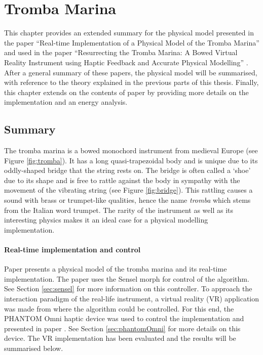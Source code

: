 \chapter{Tromba Marina}\label{ch:tromba}
This chapter provides an extended summary for the physical model presented in the paper ``Real-time Implementation of a Physical Model of the Tromba Marina'' \citeP[D] and used in the paper ``Resurrecting the Tromba Marina: A Bowed Virtual Reality Instrument using Haptic Feedback and Accurate Physical Modelling'' \citeP[E]. After a general summary of these papers, the physical model will be summarised, with reference to the theory explained in the previous parts of this thesis. Finally, this chapter extends on the contents of paper \citeP[D] by providing more details on the implementation and an energy analysis.

\section{Summary}
The tromba marina is a bowed monochord instrument from medieval Europe (see Figure \ref{fig:tromba}). It has a long quasi-trapezoidal body and is unique due to its oddly-shaped bridge that the string rests on. The bridge is often called a `shoe' due to its shape and is free to rattle against the body in sympathy with the movement of the vibrating string (see Figure \ref{fig:bridge}). This rattling causes a sound with brass or trumpet-like qualities, hence the name \textit{tromba} which stems from the Italian word trumpet. The rarity of the instrument as well as its interesting physics makes it an ideal case for a physical modelling implementation.

\subsubsection{Real-time implementation and control}
Paper \citeP[D] presents a physical model of the tromba marina and its real-time implementation. The paper uses the Sensel morph for control of the algorithm. See Section \ref{sec:sensel} for more information on this controller. To approach the interaction paradigm of the real-life instrument, a virtual reality (VR) application was made from where the algorithm could be controlled. For this end, the PHANTOM Omni haptic device was used to control the implementation and presented in paper \citeP[E]. See Section \ref{sec:phantomOmni} for more details on this device. The VR implementation has been evaluated and the results will be summarised below.

